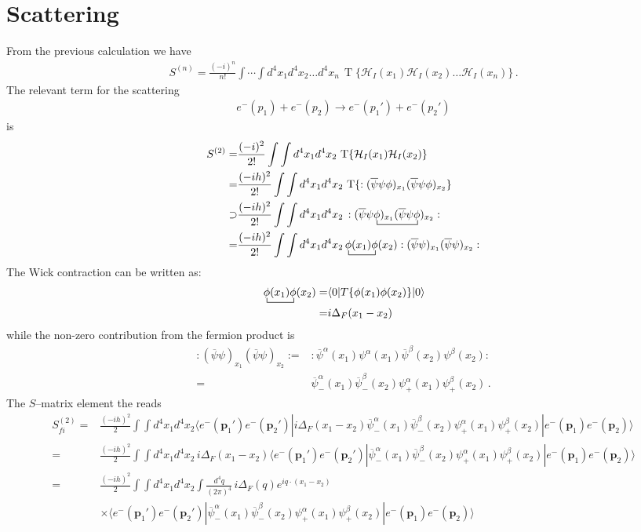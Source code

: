 \section{Scattering}
\label{sec:scattering}
From the previous calculation we have
\begin{align}
S^{(n)}=  \frac{(-i)^n}{n!}\int\cdots\int d^4x_1 d^4x_2\ldots d^4x_n\,\operatorname{T}\{\mathcal{H}_I(x_1)\mathcal{H}_I(x_2)\ldots\mathcal{H}_I(x_n)\}\,.
\end{align}
The relevant term for the scattering
\begin{align}
  e^{-}(p_1)+e^{-}(p_2)\to   e^{-}(p_1')+e^{-}(p_2')
\end{align}
is
\begin{align}
S^{(2)}=&  \frac{(-i)^2}{2!}\int\int d^4x_1 d^4x_2\,\operatorname{T}\{\mathcal{H}_I(x_1)\mathcal{H}_I(x_2)\}\nonumber\\
=&  \frac{(-ih)^2}{2!}\int\int d^4x_1 d^4x_2\,\operatorname{T}\{:(\overline{\psi}\psi\phi)_{x_1}(\overline{\psi}\psi\phi)_{x_2}\}\nonumber\\
\supset& 
 \frac{(-ih)^2}{2!}\int\int d^4x_1 d^4x_2\,:(\overline{\psi}
\bcontraction{\psi}{\phi}{)_{x_1}(\overline{\psi}\psi}{\phi}
\psi\phi)_{x_1}(\overline{\psi}\psi\phi
)_{x_2}:\nonumber\\
=&\frac{(-ih)^2}{2!}\int\int d^4x_1 d^4x_2
\bcontraction{\,}{\phi}{(x_1)}{\phi}
\,\phi(x_1)\phi(x_2):(\overline{\psi}\psi)_{x_1}(\overline{\psi}\psi)_{x_2}:
\end{align}
The Wick contraction can be written as:
\begin{align}
  \bcontraction{\,}{\phi}{(x_1)}{\phi}
\,\phi(x_1)\phi(x_2)=&\langle0|T\{\phi(x_1)\phi(x_2)\}|0\rangle\nonumber\\
=&i\Delta_F(x_1-x_2)
\end{align}
while the non-zero contribution from the fermion product is
\begin{align}
  :(\overline{\psi}\psi)_{x_1}(\overline{\psi}\psi)_{x_2}:=&
:\overline{\psi}^\alpha(x_1)\psi^\alpha(x_1)\overline{\psi}^\beta(x_2)\psi^\beta(x_2):\nonumber\\
=&\overline{\psi}^\alpha_-(x_1)\overline{\psi}^\beta_-(x_2)\psi^\alpha_+(x_1)\psi^\beta_+(x_2)\,.
\end{align}
The $S$--matrix element the reads
\begin{align}
  S^{(2)}_{fi}=&\frac{(-ih)^2}{2}\int\int d^4x_1 d^4x_2\langle e^-(\mathbf{p}_1')e^-(\mathbf{p}_2')|
i\Delta_F(x_1-x_2)\overline{\psi}^\alpha_-(x_1)\overline{\psi}^\beta_-(x_2)\psi^\alpha_+(x_1)\psi^\beta_+(x_2)|e^-(\mathbf{p}_1)e^-(\mathbf{p}_2)\rangle\nonumber\\
=&\frac{(-ih)^2}{2}\int\int d^4x_1 d^4x_2\,i\Delta_F(x_1-x_2)\langle e^-(\mathbf{p}_1')e^-(\mathbf{p}_2')|
\overline{\psi}^\alpha_-(x_1)\overline{\psi}^\beta_-(x_2)\psi^\alpha_+(x_1)\psi^\beta_+(x_2)|e^-(\mathbf{p}_1)e^-(\mathbf{p}_2)\rangle\nonumber\\
=&\frac{(-ih)^2}{2}\int\int d^4x_1 d^4x_2\int\frac{d^4q}{(2\pi)^4}\,i\Delta_F(q)e^{i q\cdot(x_1-x_2)}\nonumber\\
&\times\langle e^-(\mathbf{p}_1')e^-(\mathbf{p}_2')|
\overline{\psi}^\alpha_-(x_1)\overline{\psi}^\beta_-(x_2)\psi^\alpha_+(x_1)\psi^\beta_+(x_2)|e^-(\mathbf{p}_1)e^-(\mathbf{p}_2)\rangle
\end{align}
